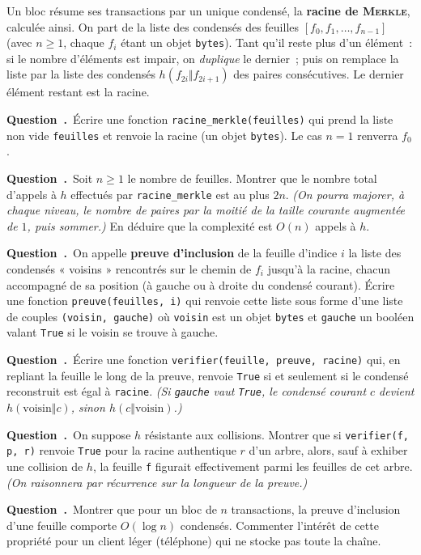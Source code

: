 \documentclass[11pt,a4paper]{article}
\newcounter{qcnt}
\newcommand{\Q}{\medskip\par\stepcounter{qcnt}\noindent\textbf{Question~\theqcnt.}~}
\newcommand{\code}[1]{\lstinline!#1!}
\begin{document}
Un bloc résume ses transactions par un unique condensé, la \textbf{racine de \textsc{Merkle}}, calculée ainsi. On part de la liste des condensés des feuilles $[f_0, f_1, \ldots, f_{n-1}]$ (avec $n\ge 1$, chaque $f_i$ étant un objet \code{bytes}). Tant qu'il reste plus d'un élément~: si le nombre d'éléments est impair, on \emph{duplique} le dernier~; puis on remplace la liste par la liste des condensés $h(f_{2i}\Vert f_{2i+1})$ des paires consécutives. Le dernier élément restant est la racine.

\Q Écrire une fonction \code{racine_merkle(feuilles)} qui prend la liste non vide \code{feuilles} et renvoie la racine (un objet \code{bytes}). Le cas $n=1$ renverra $f_0$.

\Q Soit $n\ge 1$ le nombre de feuilles. Montrer que le nombre total d'appels à $h$ effectués par \code{racine_merkle} est au plus $2n$. \emph{(On pourra majorer, à chaque niveau, le nombre de paires par la moitié de la taille courante augmentée de $1$, puis sommer.)} En déduire que la complexité est $O(n)$ appels à $h$.

\Q On appelle \textbf{preuve d'inclusion} de la feuille d'indice $i$ la liste des condensés « voisins » rencontrés sur le chemin de $f_i$ jusqu'à la racine, chacun accompagné de sa position (à gauche ou à droite du condensé courant). Écrire une fonction \code{preuve(feuilles, i)} qui renvoie cette liste sous forme d'une liste de couples \code{(voisin, gauche)} où \code{voisin} est un objet \code{bytes} et \code{gauche} un booléen valant \code{True} si le voisin se trouve à gauche.

\Q Écrire une fonction \code{verifier(feuille, preuve, racine)} qui, en repliant la feuille le long de la preuve, renvoie \code{True} si et seulement si le condensé reconstruit est égal à \code{racine}. \emph{(Si \code{gauche} vaut \code{True}, le condensé courant $c$ devient $h(\text{voisin}\Vert c)$, sinon $h(c\Vert\text{voisin})$.)}

\Q On suppose $h$ résistante aux collisions. Montrer que si \code{verifier(f, p, r)} renvoie \code{True} pour la racine authentique $r$ d'un arbre, alors, sauf à exhiber une collision de $h$, la feuille \code{f} figurait effectivement parmi les feuilles de cet arbre. \emph{(On raisonnera par récurrence sur la longueur de la preuve.)}

\Q Montrer que pour un bloc de $n$ transactions, la preuve d'inclusion d'une feuille comporte $O(\log n)$ condensés. Commenter l'intérêt de cette propriété pour un client léger (téléphone) qui ne stocke pas toute la chaîne.
\end{document}
